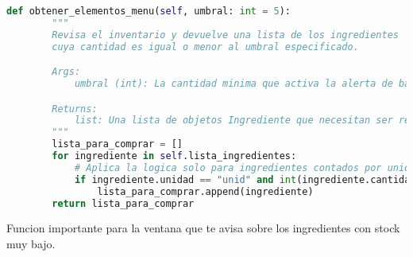 \documentclass[a4paper,12pt]{article}
\begin{document}
\begin{lstlisting}[language=Python, caption={Cambio de codigo}, frame=single]
    def obtener_elementos_menu(self, umbral: int = 5):
        """
        Revisa el inventario y devuelve una lista de los ingredientes
        cuya cantidad es igual o menor al umbral especificado.

        Args:
            umbral (int): La cantidad minima que activa la alerta de bajo stock.

        Returns:
            list: Una lista de objetos Ingrediente que necesitan ser repuestos.
        """
        lista_para_comprar = []
        for ingrediente in self.lista_ingredientes:
            # Aplica la logica solo para ingredientes contados por unidad
            if ingrediente.unidad == "unid" and int(ingrediente.cantidad) <= umbral:
                lista_para_comprar.append(ingrediente)
        return lista_para_comprar
\end{lstlisting}
Funcion importante para la ventana que te avisa sobre los ingredientes con stock muy bajo.
\end{document}
